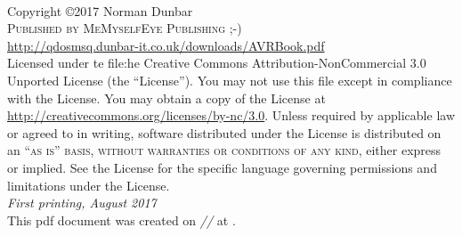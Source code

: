 \documentclass[11pt,fleqn]{book} %
\begin{document}
\frontmatter	%



\newpage
~\vfill
\thispagestyle{empty}

\noindent Copyright \copyright 2017 Norman Dunbar\\ %

\noindent \textsc{Published by MeMyselfEye Publishing ;-)}\\ %

\noindent \url{http://qdosmsq.dunbar-it.co.uk/downloads/AVRBook.pdf}\\ %

\noindent Licensed under te file:he Creative Commons Attribution-NonCommercial 3.0 Unported License (the ``License''). You may not use this file except in compliance with the License. You may obtain a copy of the License at \url{http://creativecommons.org/licenses/by-nc/3.0}. Unless required by applicable law or agreed to in writing, software distributed under the License is distributed on an \textsc{``as is'' basis, without warranties or conditions of any kind}, either express or implied. See the License for the specific language governing permissions and limitations under the License.\\ %

\noindent \textit{First printing, August 2017} \\%


\noindent This pdf document was created on \textit{\the\day/\the\month/\the\year} at \textit{\DTMcurrenttime}.


\end{document}
